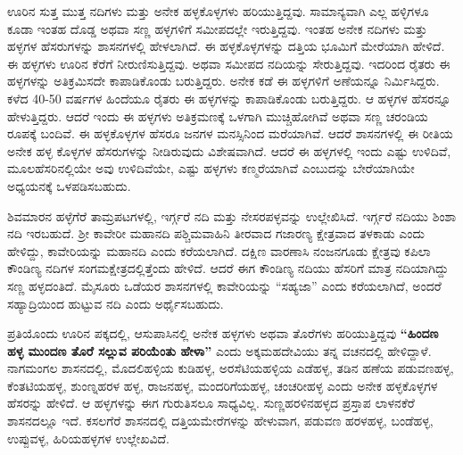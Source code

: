 ಊರಿನ ಸುತ್ತ ಮುತ್ತ ನದಿಗಳು ಮತ್ತು ಅನೇಕ ಹಳ್ಳಕೊಳ್ಳಗಳು ಹರಿಯುತ್ತಿದ್ದವು. ಸಾಮಾನ್ಯವಾಗಿ ಎಲ್ಲ ಹಳ್ಳಿಗಳೂ ಕೂಡಾ ಇಂತಹ ದೊಡ್ಡ ಅಥವಾ ಸಣ್ಣ ಹಳ್ಳಗಳಿಗೆ ಸಮೀಪದಲ್ಲೇ ಇರುತ್ತಿದ್ದವು. ಇಂತಹ ಅನೇಕ ನದಿಗಳು ಮತ್ತು ಹಳ್ಳಗಳ ಹೆಸರುಗಳನ್ನು ಶಾಸನಗಳಲ್ಲಿ ಹೇಳಲಾಗಿದೆ. ಈ ಹಳ್ಳಕೊಳ್ಳಗಳನ್ನು ದತ್ತಿಯ ಭೂಮಿಗೆ ಮೇರೆಯಾಗಿ ಹೇಳಿದೆ. ಈ ಹಳ್ಳಗಳು ಊರಿನ ಕೆರೆಗೆ ನೀರುಣಿಸುತ್ತಿದ್ದವು. ಅಥವಾ ಸಮೀಪದ ನದಿಯನ್ನು ಸೇರುತ್ತಿದ್ದವು. ಇದರಿಂದ ರೈತರು ಈ ಹಳ್ಳಗಳನ್ನು ಅತಿಕ್ರಮಿಸದೇ ಕಾಪಾಡಿಕೊಂಡು ಬರುತ್ತಿದ್ದರು. ಅನೇಕ ಕಡೆ ಈ ಹಳ್ಳಗಳಿಗೆ ಅಣೆಯನ್ನೂ ನಿರ್ಮಿಸಿದ್ದರು. ಕಳೆದ 40-50 ವರ್ಷಗಳ ಹಿಂದೆಯೂ ರೈತರು ಈ ಹಳ್ಳಗಳನ್ನು ಕಾಪಾಡಿಕೊಂಡು ಬರುತ್ತಿದ್ದರು. ಆ ಹಳ್ಳಗಳ ಹೆಸರನ್ನೂ ಹೇಳುತ್ತಿದ್ದರು. ಆದರೆ ಇಂದು ಈ ಹಳ್ಳಗಳು ಅತಿಕ್ರಮಣಕ್ಕೆ ಒಳಗಾಗಿ ಮುಚ್ಚಿಹೋಗಿವೆ ಅಥವಾ ಸಣ್ಣ ಚರಂಡಿಯ ರೂಪಕ್ಕೆ ಬಂದಿವೆ. ಈ ಹಳ್ಳಕೊಳ್ಳಗಳ ಹೆಸರೂ ಜನಗಳ ಮನಸ್ಸಿನಿಂದ ಮರೆಯಾಗಿವೆ. ಆದರೆ ಶಾಸನಗಳಲ್ಲಿ ಈ ರೀತಿಯ ಅನೇಕ ಹಳ್ಳ ಕೊಳ್ಳಗಳ ಹೆಸರುಗಳನ್ನು ನೀಡಿರುವುದು ವಿಶೇಷವಾಗಿದೆ. ಆದರೆ ಈ ಹಳ್ಳಗಳಲ್ಲಿ ಇಂದು ಎಷ್ಟು ಉಳಿದಿವೆ, ಮೂಲಹೆಸರಿನಲ್ಲಿಯೇ ಅವು ಉಳಿದಿವೆಯೇ, ಎಷ್ಟು ಹಳ್ಳಗಳು ಕಣ್ಮರೆಯಾಗಿವೆ ಎಂಬುದನ್ನು ಬೇರೆಯಾಗಿಯೇ ಅಧ್ಯಯನಕ್ಕೆ ಒಳಪಡಿಸಬಹುದು.

ಶಿವಮಾರನ ಹಳ್ಳೆಗೆರೆ ತಾಮ್ರಪಟಗಳಲ್ಲಿ, ಇರ್ಗ್ಗರೆ ನದಿ ಮತ್ತು ನೇಸರಪಳ್ಳವನ್ನು ಉಲ್ಲೇಖಿಸಿದೆ. ಇರ್ಗ್ಗರೆ ನದಿಯು ಶಿಂಶಾ ನದಿ ಇರಬಹುದೆ. ಶ‍್ರೀ ಕಾವೇರೀ ಮಹಾನದಿ ಪಶ್ಚಿಮವಾಹಿನಿ ತೀರವಾದ ಗಜಾರಣ್ಯ ಕ್ಷೇತ್ರವಾದ ತಳಕಾಡು ಎಂದು ಹೇಳಿದ್ದು, ಕಾವೇರಿಯನ್ನು ಮಹಾನದಿ ಎಂದು ಕರೆಯಲಾಗಿದೆ. ದಕ್ಷಿಣ ವಾರಣಾಸಿ ನಂಜನಗೂಡು ಕ್ಷೇತ್ರವು ಕಪಿಲಾ ಕೌಂಡಿಣ್ಯ ನದಿಗಳ ಸಂಗಮಕ್ಷೇತ್ರದಲ್ಲಿತ್ತೆಂದು ಹೇಳಿದೆ. ಆದರೆ ಈಗ ಕೌಂಡಿಣ್ಯ ನದಿಯು ಹೆಸರಿಗೆ ಮಾತ್ರ ನದಿಯಾಗಿದ್ದು ಸಣ್ಣ ಹಳ್ಳದಂತಿದೆ. ಮೈಸೂರು ಒಡೆಯರ ಶಾಸನಗಳಲ್ಲಿ ಕಾವೇರಿಯನ್ನು “ಸಹ್ಯಜಾ” ಎಂದು ಕರೆಯಲಾಗಿದೆ, ಅಂದರೆ ಸಹ್ಯಾದ್ರಿಯಿಂದ ಹುಟ್ಟುವ ನದಿ ಎಂದು ಅರ್ಥೈಸಬಹುದು.

ಪ್ರತಿಯೊಂದು ಊರಿನ ಪಕ್ಕದಲ್ಲಿ, ಆಸುಪಾಸಿನಲ್ಲಿ ಅನೇಕ ಹಳ್ಳಗಳು ಅಥವಾ ತೊರೆಗಳು ಹರಿಯುತ್ತಿದ್ದವು \textbf{“ಹಿಂದಣ ಹಳ್ಳ ಮುಂದಣ ತೊರೆ ಸಲ್ಲುವ ಪರಿಯೆಂತು ಹೇಳಾ”} ಎಂದು ಅಕ್ಕಮಹದೇವಿಯು ತನ್ನ ವಚನದಲ್ಲಿ ಹೇಳಿದ್ದಾಳೆ. ನಾಗಮಂಗಲ ಶಾಸನದಲ್ಲಿ, ಮೊದಲಿಹಳ್ಳಿಯ ಕುಡಿಹಳ್ಳ, ಅರಸೆಟಿಯಹಳ್ಳಿಯ ಎಡೆಹಳ್ಳ, ತಡಿನ ಹಣೆಯ ಪಡುವಣಹಳ್ಳ, ಕೆಂತಟಿಯಹಳ್ಳ, ಶುಂಣ್ನಹರಳ ಹಳ್ಳ, ರಾಜನಹಳ್ಳ, ಮಂದರಿಗೆಯಹಳ್ಳ, ಚಂಚರೀಹಳ್ಳ ಎಂದು ಅನೇಕ ಹಳ್ಳಕೊಳ್ಳಗಳ ಹೆಸರನ್ನು ಹೇಳಿದೆ. ಆ ಹಳ್ಳಗಳನ್ನು ಈಗ ಗುರುತಿಸಲೂ ಸಾಧ್ಯವಿಲ್ಲ. ಸುಣ್ಣಹರಳಿನಹಳ್ಳದ ಪ್ರಸ್ತಾಪ ಲಾಳನಕೆರೆ ಶಾಸನದಲ್ಲೂ ಇದೆ. ಕಸಲಗೆರೆ ಶಾಸನದಲ್ಲಿ ದತ್ತಿಯಮೇರೆಗಳನ್ನು ಹೇಳುವಾಗ, ಪಡುವಣ ಹರಳಹಳ್ಳ, ಬಂಡೆಹಳ್ಳ, ಉಪ್ಪುವಳ್ಳ, ಹಿರಿಯಹಳ್ಳಗಳ ಉಲ್ಲೇಖವಿದೆ.

